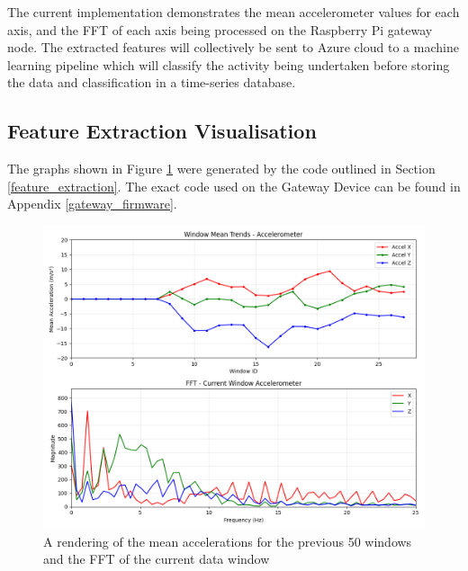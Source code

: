 \documentclass[conference]{IEEEtran}
\begin{document}
The current implementation demonstrates the mean accelerometer values for each axis, and the FFT of each axis being processed on the Raspberry Pi gateway node. The extracted features will collectively be sent to Azure cloud to a machine learning pipeline which will classify the activity being undertaken before storing the data and classification in a time-series database.

\subsection{Feature Extraction Visualisation}
The graphs shown in Figure \ref{fig:extracted_data} were generated by the code outlined in Section  \ref{feature_extraction}. The exact code used on the Gateway Device can be found in Appendix \ref{gateway_firmware}.

\begin{figure}[h]
	\centering
	\includegraphics[width=0.9\columnwidth]{media/Figure_2.png}
	\caption{A rendering of the mean accelerations for the previous 50 windows and the FFT of the current data window}
	\label{fig:extracted_data}
\end{figure}
\end{document}
